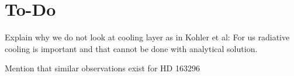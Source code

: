 \section{To-Do}
Explain why we do not look at cooling layer as in Kohler et al: For us radiative cooling is important and that cannot be done with analytical solution.

Mention that similar observations exist for HD 163296
